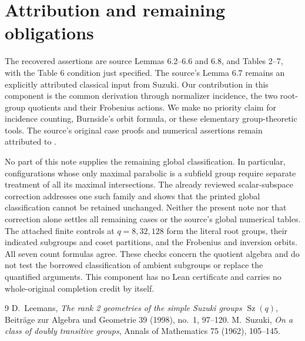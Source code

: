 \documentclass[11pt,a4paper]{article}
\newcommand{\Sz}{\operatorname{Sz}}
\begin{document}
\section{Attribution and remaining obligations}
The recovered assertions are source Lemmas 6.2--6.6 and 6.8,
and Tables 2--7, with the Table 6 condition just specified.
The source's Lemma 6.7 remains an explicitly attributed classical
input from Suzuki. Our contribution in this component is the
common derivation through normalizer incidence, the two root-group
quotients and their Frobenius actions. We make no priority claim
for incidence counting, Burnside's orbit formula, or these elementary
group-theoretic tools. The source's original case proofs and numerical
assertions remain attributed to \cite{source}.

No part of this note supplies the remaining global classification.
In particular, configurations whose only maximal parabolic is a
subfield group require separate treatment of all its maximal
intersections. The already reviewed scalar-subspace correction
addresses one such family and shows that the printed global
classification cannot be retained unchanged. Neither the present
note nor that correction alone settles all remaining cases or
the source's global numerical tables. The attached finite controls
at $q=8,32,128$ form the literal root groups, their indicated
subgroups and coset partitions, and the Frobenius and inversion
orbits. All seven count formulas agree. These checks concern the
quotient algebra and do not test the borrowed classification of
ambient subgroups or replace the quantified arguments. This component
has no Lean certificate and carries no whole-original completion
credit by itself.

\begin{thebibliography}{9}
 D.~Leemans, \emph{The rank 2 geometries of the simple
Suzuki groups $\Sz(q)$}, Beitr\"age zur Algebra und Geometrie
39 (1998), no.~1, 97--120.
 M.~Suzuki, \emph{On a class of doubly transitive groups},
Annals of Mathematics 75 (1962), 105--145.
\end{thebibliography}
\end{document}
